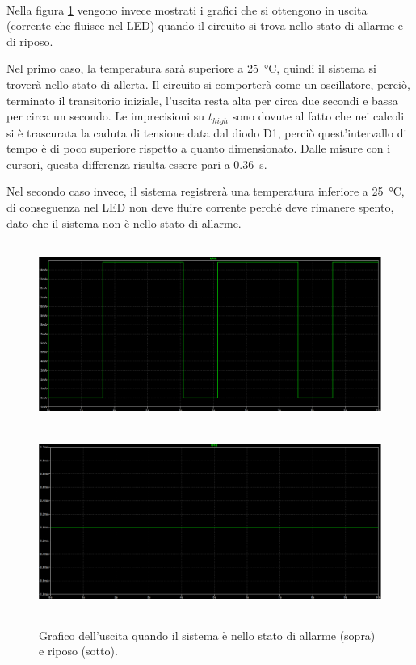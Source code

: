 \documentclass{report}
\begin{document}
\\Nella figura \ref{figura:555out} vengono invece mostrati i grafici che si ottengono in uscita (corrente che fluisce nel LED) quando il circuito si trova nello stato di allarme e di riposo. \par
Nel primo caso, la temperatura sarà superiore a \SI{25}{\degree}C, quindi il sistema si troverà nello stato di allerta. Il circuito si comporterà come un oscillatore, perciò, terminato il transitorio iniziale, l'uscita resta alta per circa due secondi e bassa per circa un secondo. Le imprecisioni su $t_{high}$ sono dovute al fatto che nei calcoli si è trascurata la caduta di tensione data dal diodo D1, perciò quest'intervallo di tempo è di poco superiore rispetto a quanto dimensionato. Dalle misure con i cursori, questa differenza risulta essere pari a \SI{0.36}{\second}. \par
Nel secondo caso invece, il sistema registrerà una temperatura inferiore a \SI{25}{\degree}C, di conseguenza nel LED non deve fluire corrente perché deve rimanere spento, dato che il sistema non è nello stato di allarme.
\begin{figure}[h!]
	\centering
	\includegraphics[height=6cm]{immagini/555on}
	\includegraphics[height=6cm]{immagini/555off}
	\caption{Grafico dell'uscita quando il sistema è nello stato di allarme (sopra) e riposo (sotto).} 
	\label{figura:555out}
\end{figure}
\end{document}
